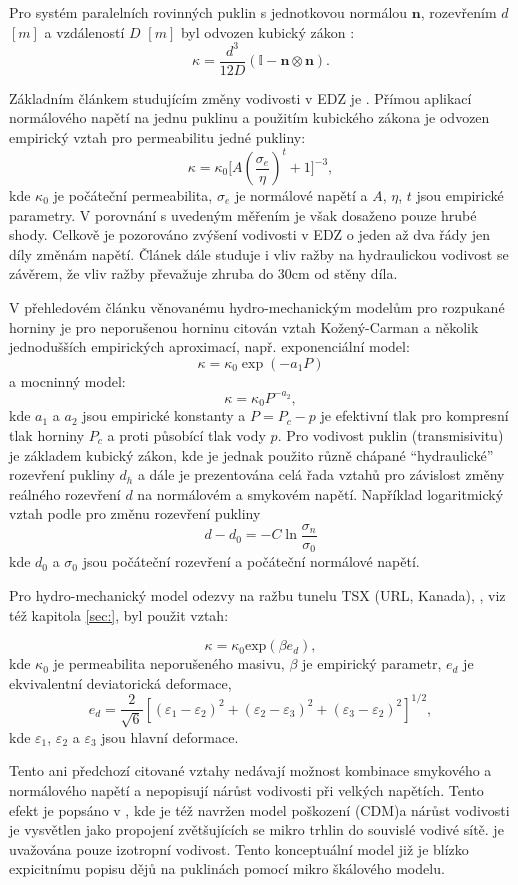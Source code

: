 \documentclass{article}
\def\vc#1{\mathbf{\boldsymbol{#1}}}     %
\def\tn#1{{\mathbb{#1}}}    %
\begin{document}
Pro systém paralelních rovinných puklin s jednotkovou normálou $\vc n$, rozevřením $d$ $[m]$ a vzdáleností $D$ $[m]$
byl odvozen kubický zákon \cite{Snow1969}:
\[
 \kappa = \frac{d^3}{12 D} (\tn I - \vc n \otimes \vc n).
\]

Základním článkem studujícím změny vodivosti v EDZ je \cite{Kelsall1984}. Přímou aplikací normálového napětí
na jednu puklinu a použitím kubického zákona je odvozen empirický vztah pro permeabilitu jedné pukliny:
\[
  \kappa = \kappa_0 \Big[A (\frac{\sigma_e}{\eta})^t+1\Big]^{-3},
\]
kde $\kappa_0$ je počáteční permeabilita, $\sigma_e$ je normálové napětí a $A$, $\eta$, $t$ jsou empirické parametry.
V porovnání s uvedeným měřením je však dosaženo pouze hrubé shody. Celkově je pozorováno zvýšení vodivosti v EDZ o jeden až dva řády jen díly změnám napětí.
Článek dále studuje i vliv ražby na hydraulickou vodivost se závěrem, že vliv ražby převažuje zhruba do 30cm od stěny díla. 


V přehledovém článku \cite{Rutqvist2003} věnovanému hydro-mechanickým modelům pro rozpukané horniny
je pro neporušenou horninu citován vztah Kožený-Carman a několik jednodušších empirických aproximací, např.
exponenciální model:
\[
  \kappa=\kappa_0 \exp(-a_1 P)
\]
a 
mocninný model:
\[
  \kappa=\kappa_0 P^{-a_2},
\]
kde $a_1$ a $a_2$ jsou empirické konstanty a $P=P_c - p$ je efektivní tlak pro kompresní tlak horniny $P_c$ a proti působící tlak vody $p$.
Pro vodivost puklin (transmisivitu) je základem kubický zákon, kde je jednak použito různě chápané ``hydraulické'' rozevření pukliny $d_h$ 
a dále je prezentována celá řada vztahů pro závislost změny reálného rozevření $d$ na normálovém a smykovém napětí. Například logaritmický vztah 
podle \cite{Kohl1995} pro změnu rozevření pukliny
\[
   d - d_0 = - C \ln \frac{\sigma_n}{\sigma_0}
\]
kde $d_0$ a $\sigma_0$ jsou počáteční rozevření a počáteční normálové napětí. 

Pro hydro-mechanický model odezvy na ražbu tunelu TSX (URL, Kanada), \cite{Rutqvist2009}, viz též kapitola \ref{sec:}, byl použit vztah:

$$
	\kappa = \kappa_0 \mbox{exp}(\beta e_d),
$$
kde $\kappa_0$ je permeabilita neporušeného masivu, $\beta$ je empirický parametr, $e_d$ je ekvivalentní
deviatorická deformace,
$$
	e_d = \frac{2}{\sqrt{6}}[(\varepsilon_1 - \varepsilon_2)^2 + (\varepsilon_2 - \varepsilon_3)^2 + (\varepsilon_3 - \varepsilon_2)^2]^{1/2},
$$
kde $\varepsilon_1$, $\varepsilon_2$ a $\varepsilon_3$ jsou hlavní deformace.


Tento ani předchozí citované vztahy nedávají možnost kombinace smykového a normálového napětí a nepopisují 
nárůst vodivosti při velkých napětích. Tento efekt je popsáno v \cite{Souley2001}, kde je též navržen model poškození (CDM)a 
nárůst vodivosti je vysvětlen jako propojení zvětšujících se mikro trhlin do souvislé vodivé sítě.
je uvažována pouze izotropní vodivost. Tento konceptuální model již je blízko expicitnímu popisu dějů na puklinách 
pomocí mikro škálového modelu.
\end{document}
